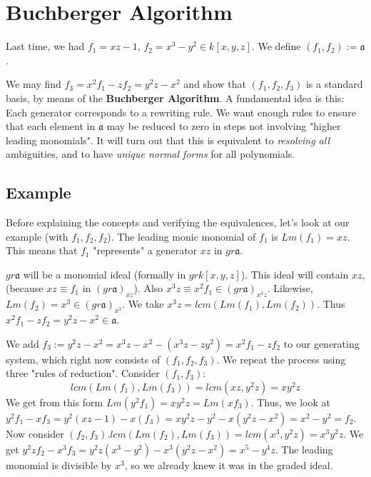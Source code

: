 
\section{Buchberger Algorithm}
Last time, we had $f_1 = xz-1$,
$f_2 = x^3-y^2 \in k[x,y,z]$.
We define $(f_1, f_2) := \mathfrak{a}$.

We may find $f_3=x^2f_1-zf_2=y^2z-x^2$
and show that $(f_1,f_2,f_3)$ is a standard 
basis, by means of the \textbf{Buchberger Algorithm}.
A fundamental idea is this: Each generator corresponds to
a rewriting rule. We want enough rules to ensure that each element in $\mathfrak{a}$ may be reduced to zero in steps not
involving "higher leading monomials". It will turn out that this
is equivalent to \textit{resolving all} ambiguities, and 
to have \textit{unique normal forms} for all polynomials.

\subsection{Example}

Before explaining the concepts and verifying the equivalences,
let's look at our example (with $f_1, f_2, f_2$). The leading
monic monomial of $f_1$ is $Lm(f_1) = xz$. This means that $f_1$
"represents" a generator $xz$ in $gr \mathfrak{a}$.

$gr\mathfrak{a}$ will be a monomial ideal (formally in
$gr k[x,y,z]$). This ideal will contain $xz$, (because
$xz \equiv f_1$ in $(gr \mathfrak{a})_{xz}$). 
Also $x^3z \equiv x^2f_1 \in (gr \mathfrak{a})_{x^3z}$.
Likewise, $Lm(f_2) = x^3 \in (gr \mathfrak{a})_{x^3}$.
We take $x^3z = lcm(Lm(f_1), Lm(f_2))$.
Thus $x^2f_1-zf_2=y^2z-x^2\in \mathfrak{a}$.


We add $f_3 := y^2z-x^2 = x^3z-x^2 - 
(x^3z-zy^2) = x^2f_1 - zf_2$ to our generating system, which
right now consists of $(f_1, f_2, f_3)$. We repeat the process 
using three "rules of reduction". Consider $(f_1, f_3)$:
\[
lcm(Lm(f_1), Lm(f_3)) = lcm(xz, y^2z) = xy^2z
\]
We get from this form $Lm(y^2f_1) = xy^2z = Lm(xf_3)$.
Thus, we look at $ y^2f_1 - xf_3 = y^2(xz-1) - x(f_3) = 
xy^2z - y^2 - x(y^2z-x^2) = x^2-y^2 = f_2$.
Now consider $(f_2, f_3). lcm(Lm(f_2), Lm(f_3)) = 
lcm(x^3, y^2z) = x^3y^2z$. We get
$y^2zf_2-x^3f_3 = y^2z(x^3-y^2)-x^3(y^2z-x^2)=x^5-y^4z$.
The leading monomial is divisible by $x^3$,
so we already knew it was in the graded ideal.

